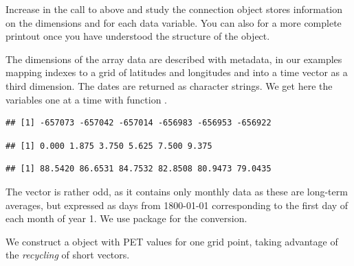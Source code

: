 \documentclass[krantz2]{krantz}\usepackage{knitr}
\begin{document}
\begin{advplayground}
Increase  in the call to  above and study the connection object stores information on the dimensions and for each data variable. You can also  for a more complete printout once you have understood the structure of the object.
\end{advplayground}
The dimensions of the array data are described with metadata, in our examples mapping indexes to a grid of latitudes and longitudes and into a time vector as a third dimension. The dates are returned as character strings. We get here the variables one at a time with function .

\begin{knitrout}\footnotesize
{}\color{fgcolor}\begin{kframe}
\begin{alltt}
 \hlkwb{<-}  \hlstd{)}
\end{alltt}
\begin{verbatim}
## [1] -657073 -657042 -657014 -656983 -656953 -656922
\end{verbatim}
\begin{alltt}
 \hlkwb{<-}   \hlstd{)}
\end{alltt}
\begin{verbatim}
## [1] 0.000 1.875 3.750 5.625 7.500 9.375
\end{verbatim}
\begin{alltt}
 \hlkwb{<-}  \hlstd{)}
\end{alltt}
\begin{verbatim}
## [1] 88.5420 86.6531 84.7532 82.8508 80.9473 79.0435
\end{verbatim}
\end{kframe}
\end{knitrout}

The  vector is rather odd, as it contains only monthly data as these are long-term averages, but expressed as days from 1800-01-01 corresponding to the first day of each month of year 1. We use package  for the conversion.

We construct a  object with PET values for one grid point, taking advantage of the \emph{recycling} of short vectors.
\end{document}
